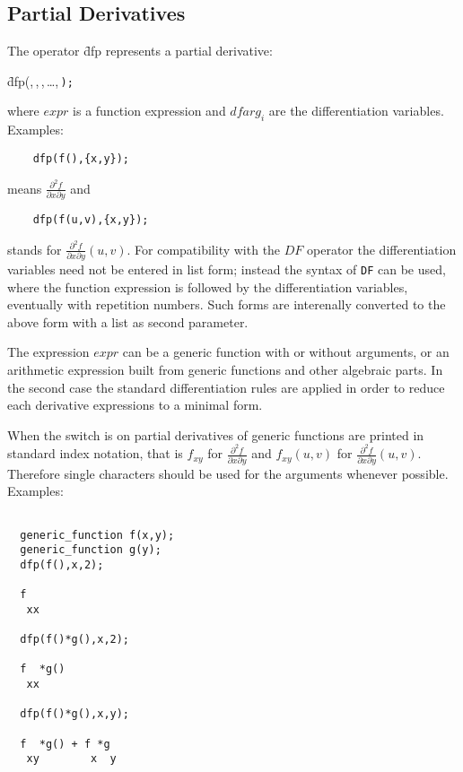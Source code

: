\subsection{Partial Derivatives}

\hypertarget{operator:DFP}{}
The operator \f{dfp} represents a partial derivative:
\begin{syntax}
  \f{dfp(},\,,\,,\,\dots,\,\texttt{);}
\end{syntax}
\noindent
where $expr$ is a function expression and $dfarg_i$ are
the differentiation variables. Examples:

\begin{verbatim}
    dfp(f(),{x,y});
\end{verbatim}
means $\frac{\partial ^2 f}{\partial x \partial y}$ and
\begin{verbatim}
    dfp(f(u,v),{x,y});
\end{verbatim}
stands for $\frac{\partial ^2 f}{\partial x \partial y} (u,v)$.
For compatibility with the $DF$ operator the differentiation
variables need not be entered in list form; instead the syntax
of \texttt{DF} can be used, where the function expression is followed
by the differentiation variables, eventually with repetition
numbers. Such forms are interenally converted to the above
form with a list as second parameter.

The expression $expr$ can be a generic function
with or without arguments, or an arithmetic expression built
from generic functions and other algebraic parts. In the
second case the standard differentiation rules are applied
in order to reduce each derivative expressions to a minimal
form.

When the switch  is on partial derivatives of generic
functions are printed in standard index notation, that is
$f_{xy}$ for $\frac{\partial ^2 f}{\partial x \partial y}$
and $f_{xy}(u,v)$ for $\frac{\partial ^2 f}{\partial x \partial y}(u,v)$.
Therefore single characters should be used for the arguments
whenever possible. Examples:

\begin{verbatim}

  generic_function f(x,y);
  generic_function g(y);
  dfp(f(),x,2);

  f
   xx

  dfp(f()*g(),x,2);

  f  *g()
   xx

  dfp(f()*g(),x,y);

  f  *g() + f *g
   xy        x  y

\end{verbatim}

